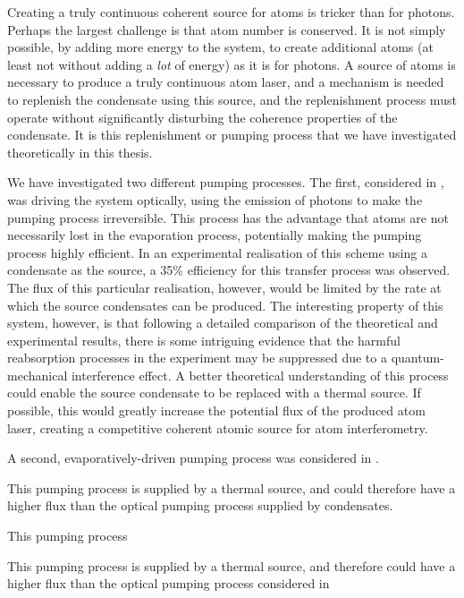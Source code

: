 Creating a truly continuous coherent source for atoms is tricker than for photons.  Perhaps the largest challenge is that atom number is conserved.  It is not simply possible, by adding more energy to the system, to create additional atoms (at least not without adding a \emph{lot} of energy) as it is for photons.  A source of atoms is necessary to produce a truly continuous atom laser, and a mechanism is needed to replenish the condensate using this source, and the replenishment process must operate without significantly disturbing the coherence properties of the condensate.  It is this replenishment or pumping process that we have investigated theoretically in this thesis.

We have investigated two different pumping processes.  The first, considered in , was driving the system optically, using the emission of photons to make the pumping process irreversible.  This process has the advantage that atoms are not necessarily lost in the evaporation process, potentially making the pumping process highly efficient.  In an experimental realisation of this scheme using a condensate as the source, a 35\% efficiency for this transfer process was observed.  The flux of this particular realisation, however, would be limited by the rate at which the source condensates can be produced.  The interesting property of this system, however, is that following a detailed comparison of the theoretical and experimental results, there is some intriguing evidence that the harmful reabsorption processes in the experiment may be suppressed due to a quantum-mechanical interference effect.  A better theoretical understanding of this process could enable the source condensate to be replaced with a thermal source.  If possible, this would greatly increase the potential flux of the produced atom laser, creating a competitive coherent atomic source for atom interferometry.

A second, evaporatively-driven pumping process was considered in .  



This pumping process is supplied by a thermal source, and could therefore have a higher flux than the optical pumping process supplied by condensates.


This pumping process 


This pumping process is supplied by a thermal source, and therefore could have a higher flux than the optical pumping process considered in \


